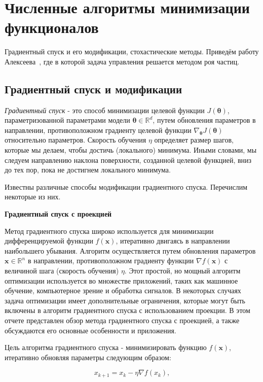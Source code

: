\section{Численные алгоритмы минимизации функционалов}\label{sec:ch4/sec2}
Градиентный спуск и его модификации, стохастические методы.
Приведём работу Алексеева~\cite{Alekseev2019Simulation}, где в которой
задача управления решается методом роя частиц.

\subsection{Градиентный спуск и модификации}
\label{subsec:ch4/sec2/grad}
\textit{Градиентный спуск} - это способ минимизации целевой функции
$J(\boldsymbol{\theta})$, параметризованной параметрами модели
$\boldsymbol{\theta} \in \mathbb{R}^{d}$, путем обновления параметров
в направлении, противоположном градиенту целевой функции
$\nabla_{\boldsymbol{\theta}} J(\boldsymbol{\theta})$
относительно параметров.
Скорость обучения $\eta$ определяет размер шагов, которые мы делаем,
чтобы достичь (локального) минимума.
Иными словами, мы следуем направлению наклона поверхности,
созданной целевой функцией, вниз до тех пор,
пока не достигнем локального минимума.

Известны различные способы модификации градиентного спуска.
Перечислим некоторые из них.

\textbf{Градиентный спуск с проекцией}

Метод градиентного спуска широко используется для минимизации дифференцируемой
функции $f(\mathbf{x})$, итеративно двигаясь в направлении наибольшего убывания.
Алгоритм осуществляется путем обновления параметров
$\mathbf{x} \in \mathbb{R}^n$ в направлении, противоположном
градиенту функции $\nabla f(\mathbf{x})$ с величиной шага
(скорость обучения) $\eta$.
Этот простой, но мощный алгоритм оптимизации используется во
множестве приложений, таких как машинное обучение, компьютерное
зрение и обработка сигналов.
В некоторых случаях задача оптимизации
имеет дополнительные ограничения, которые могут быть включены в
алгоритм градиентного спуска с использованием проекции.
В этом отчете представлен обзор метода градиентного спуска с проекцией,
а также обсуждаются его основные особенности и приложения.


Цель алгоритма градиентного спуска - минимизировать функцию
$f(\mathbf{x})$, итеративно обновляя параметры следующим образом:

\[ x_{k+1} = x_k - \eta \nabla f(x_k), \]

